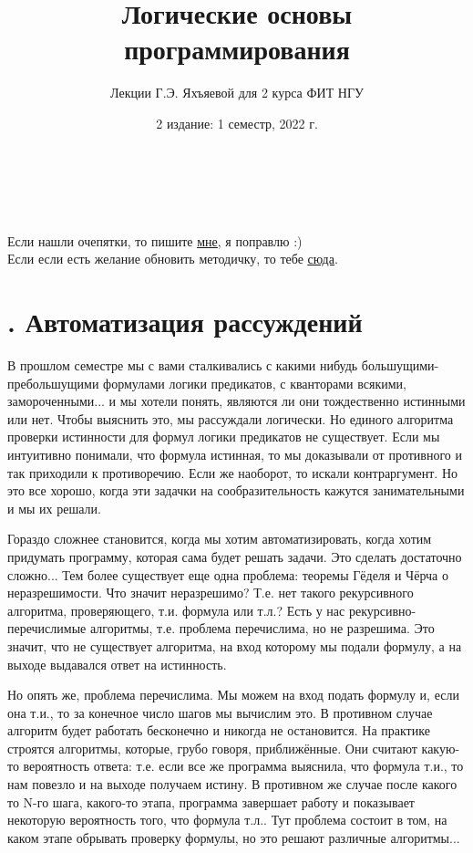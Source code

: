 \documentclass[18pt, a4paper]{extarticle}
\title{Логические основы программирования}
\author{Лекции Г.Э. Яхъяевой для 2 курса ФИТ НГУ}
\date{2 издание: 1 семестр, 2022 г.}
\newcounter{thm}
\newcounter{par}
\newcounter{zap}
\newcommand{\msection}[1]{\stepcounter{thm}\section*{\thethm. #1}\addcontentsline{toc}{section}{\thethm. #1}}
\begin{document}
\linespread{1.3}
 \fontsize{19pt}{22pt}\selectfont
\maketitle

\tableofcontents

\leavevmode\\\\\leavevmode\begin{center}
    Если нашли очепятки, то пишите \href{https://vk.com/id177003653}{\underline{мне}}, я поправлю :)\\
	Если если есть желание обновить методичку, то тебе \href{https://github.com/comiam/LOP-book}{\underline{сюда}}.
\end{center}

\newpage

\setcounter{par}{22}
\setcounter{zap}{1}
\setcounter{thm}{0}

\msection{Автоматизация рассуждений}

В прошлом семестре мы с вами сталкивались с какими нибудь большущими-пребольшущими формулами логики предикатов, с кванторами всякими, замороченными... и мы хотели понять, являются ли они тождественно истинными или нет. Чтобы выяснить это, мы рассуждали логически. Но единого алгоритма проверки истинности для формул логики предикатов не существует. Если мы интуитивно понимали, что формула истинная, то мы доказывали от противного и так приходили к противоречию. Если же наоборот, то искали контраргумент. Но это все хорошо, когда эти задачки на сообразительность кажутся занимательными и мы их решали. 

Гораздо сложнее становится, когда мы хотим автоматизировать, когда хотим придумать программу, которая сама будет решать задачи. Это сделать достаточно сложно... Тем более существует еще одна проблема: теоремы Гёделя и Чёрча о неразрешимости. Что значит неразрешимо? Т.е. нет такого рекурсивного алгоритма, проверяющего, т.и. формула или т.л.? Есть у нас рекурсивно-перечислимые алгоритмы, т.е. проблема перечислима, но не разрешима. Это значит, что не существует алгоритма, на вход которому мы подали формулу, а на выходе выдавался ответ на истинность.

Но опять же, проблема перечислима. Мы можем на вход подать формулу и, если она т.и., то за конечное число шагов мы вычислим это. В противном случае алгоритм будет работать бесконечно и никогда не остановится. На практике строятся алгоритмы, которые, грубо говоря, приближённые. Они считают какую-то вероятность ответа: т.е. если все же программа выяснила, что формула т.и., то нам повезло и на выходе получаем истину. В противном же случае после какого то N-го шага, какого-то этапа, программа завершает работу и показывает некоторую вероятность того, что формула т.л.. Тут проблема состоит в том, на каком этапе обрывать проверку формулы, но это решают различные алгоритмы...
\end{document}
